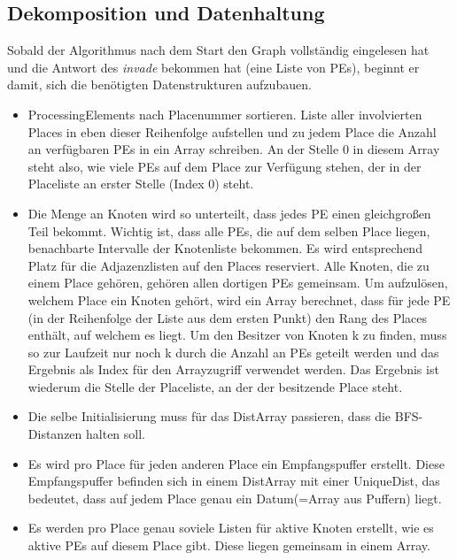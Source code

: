 \subsection{Dekomposition und Datenhaltung} %
\label{sub:dekomposition_und_datenhaltung}

Sobald der Algorithmus nach dem Start den Graph vollständig eingelesen hat und die Antwort des \textit{invade} bekommen hat (eine Liste von PEs), beginnt er damit, sich die benötigten Datenstrukturen aufzubauen.
\begin{itemize}
	\item ProcessingElements nach Placenummer sortieren. Liste aller involvierten Places in eben dieser Reihenfolge aufstellen und zu jedem Place die Anzahl an verfügbaren PEs in ein Array schreiben. An der Stelle 0 in diesem Array steht also, wie viele PEs auf dem Place zur Verfügung stehen, der in der Placeliste an erster Stelle (Index 0) steht.
	\item Die Menge an Knoten wird so unterteilt, dass jedes PE einen gleichgroßen Teil bekommt. Wichtig ist, dass alle PEs, die auf dem selben Place liegen, benachbarte Intervalle der Knotenliste bekommen. Es wird entsprechend Platz für die Adjazenzlisten auf den Places reserviert. Alle Knoten, die zu einem Place gehören, gehören allen dortigen PEs gemeinsam. Um aufzulösen, welchem Place ein Knoten gehört, wird ein Array berechnet, dass für jede PE (in der Reihenfolge der Liste aus dem ersten Punkt) den Rang des Places enthält, auf welchem es liegt. Um den Besitzer von Knoten k zu finden, muss so zur Laufzeit nur noch k durch die Anzahl an PEs geteilt werden und das Ergebnis als Index für den Arrayzugriff verwendet werden. Das Ergebnis ist wiederum die Stelle der Placeliste, an der der besitzende Place steht.
	\item Die selbe Initialisierung muss für das DistArray passieren, dass die BFS-Distanzen halten soll.
	\item Es wird pro Place für jeden anderen Place ein Empfangspuffer erstellt. Diese Empfangspuffer befinden sich in einem DistArray mit einer UniqueDist, das bedeutet, dass auf jedem Place genau ein Datum(=Array aus Puffern) liegt.
	\item Es werden pro Place genau soviele Listen für aktive Knoten erstellt, wie es aktive PEs auf diesem Place gibt. Diese liegen gemeinsam in einem Array.
\end{itemize}

